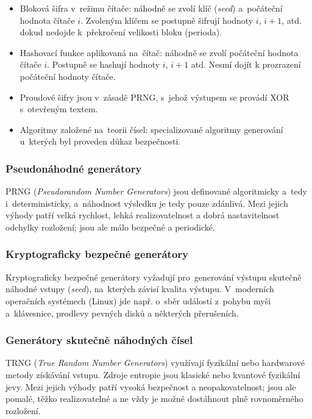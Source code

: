 \begin{itemize}
    \item
        Bloková šifra v~režimu čítače: náhodně se zvolí klíč (\emph{seed}) a~počáteční hodnota čítače $i$.
        Zvoleným klíčem se postupně šifrují hodnoty $i$, $i+1$, atd. dokud nedojde k~překročení velikosti bloku (perioda).
    \item
        Hashovací funkce aplikovaná na~čítač: náhodně se zvolí počáteční hodnota čítače $i$.
        Postupně se hashují hodnoty $i$, $i+1$ atd.
        Nesmí dojít k prozrazení počáteční hodnoty čítače.
    \item
        Proudové šifry jsou v~zásadě PRNG, s~jehož výstupem se provádí XOR s~otevřeným textem.
    \item
        Algoritmy založené na~teorii čísel: specializované algoritmy generování u~kterých byl proveden důkaz bezpečnosti.
\end{itemize}


\subsubsection{Pseudonáhodné generátory}

PRNG (\emph{Pseudorandom Number Generators}) jsou definované algoritmicky a~tedy i~deterministicky, a~náhodnost výsledku je tedy pouze zdánlivá.
Mezi jejich výhody patří velká rychlost, lehká realizovatelnost a dobrá nastavitelnost odchylky rozložení; jsou ale málo bezpečné a periodické.


\subsubsection{Kryptograficky bezpečné generátory}

Kryptograficky bezpečné generátory vyžadují pro~generování výstupu skutečně náhodné vstupy (\emph{seed}), na~kterých závisí kvalita výstupu.
V~moderních operačních systémech (Linux) jde např. o~sběr událostí z~pohybu myši a~klávesnice, prodlevy pevných disků a některých přerušeních.


\subsubsection{Generátory skutečně náhodných čísel}

TRNG (\emph{True Random Number Generators}) využívají fyzikální nebo hardwarové metody získávání vstupu.
Zdroje entropie jsou klasické nebo kvantové fyzikální jevy.
Mezi jejich výhody patří vysoká bezpečnost a neopakovatelnost; jsou ale pomalé, těžko realizovatelné a ne vždy je možné dostáhnout plně rovnoměrného rozložení.


